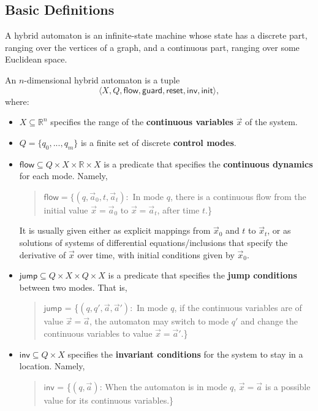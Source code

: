 \documentclass[envcountsect]{llncs}
\newcommand{\flow}{\mathsf{flow}}
\newcommand{\jump}{\mathsf{jump}}
\newcommand{\inv}{\mathsf{inv}}
\newcommand{\init}{\mathsf{init}}
\newcommand{\guard}{\mathsf{guard}}
\newcommand{\reset}{\mathsf{reset}}
\newcommand{\R}{\mathbb{R}}
\begin{document}
\subsection{Basic Definitions}

A hybrid automaton is an infinite-state machine whose state has a discrete part, ranging over the vertices of a graph, and a continuous part, ranging over some Euclidean space. 
\begin{definition}\label{auto-def}
An $n$-dimensional hybrid automaton is a tuple $$\langle X, Q, \flow, \guard, \reset, \inv, \init\rangle,$$ where:
\begin{itemize}
\item $X\subseteq \mathbb{R}^n$ specifies the range of the {\bf continuous variables} $\vec x$ of the system. 
\item $Q=\{q_0,...,q_m\}$ is a finite set of discrete {\bf control modes}. 
\item $\flow \subseteq Q\times X\times \R \times X$ is a predicate that specifies the {\bf continuous dynamics} for each mode. Namely, 
\begin{quote}
$\flow = \{(q, \vec a_0, t, \vec a_t):$ In mode $q$, there is a continuous flow from the initial value $\vec x = \vec a_0$ to $\vec x = \vec a_t$, after time $t$.\}
\end{quote}
It is usually given either as explicit mappings from $\vec x_0$ and $t$ to $\vec x_t$, or as solutions of systems of differential equations/inclusions that specify the derivative of $\vec x$ over time, with initial conditions given by $\vec x_0$. 

\item $\jump\subseteq Q\times X\times Q\times X$ is a predicate that specifies the {\bf jump conditions} between two modes. That is,  
\begin{quote}
$\jump$ = \{$(q,q',\vec a,\vec a'):$ In mode $q$, if the continuous variables are of value $\vec x = \vec a$, the automaton may switch to mode $q'$ and change the continuous variables to value $\vec x = \vec a'$.\}
\end{quote}

\item $\inv \subseteq Q\times X$ specifies the {\bf invariant conditions} for the system to stay in a location. Namely,
\begin{quote}
$\inv$ = \{$(q,\vec a)$: When the automaton is in mode $q$, $\vec x = \vec a$ is a possible value for its continuous variables.\}
\end{quote}


\end{itemize}
\end{definition}
\end{document}

